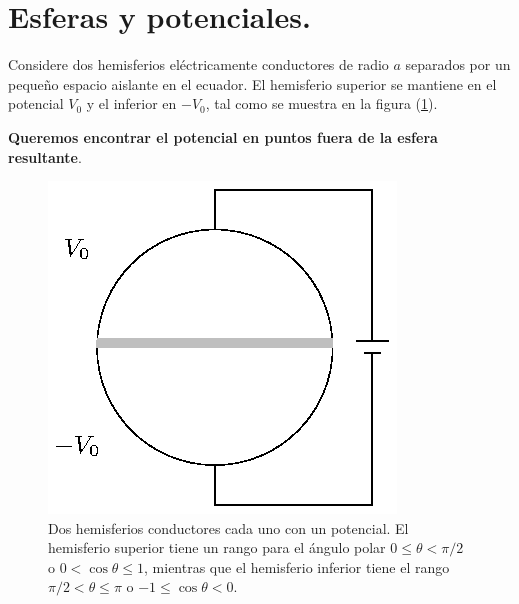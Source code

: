 \section{Esferas y potenciales.}

Considere dos hemisferios eléctricamente conductores de radio $a$ separados por un pequeño espacio aislante en el ecuador. El hemisferio superior se mantiene en el potencial $V_{0}$ y el inferior en $-V_{0}$, tal como se muestra en la figura (\ref{fig_figura_esfera_03}).
\par
\textbf{Queremos encontrar el potencial en puntos fuera de la esfera resultante}.
\begin{figure}[H]
    \centering
    \includegraphics[scale=1.3]{Imagenes/Ejemplo_Esfera_03.eps}
    \caption{Dos hemisferios conductores cada uno con un potencial. El hemisferio superior tiene un rango para el ángulo polar $0 \leq \theta < \pi/2$ o $0 < \cos \theta \leq 1$, mientras que el hemisferio inferior tiene el rango $\pi/2 < \theta \leq \pi $ o $-1 \leq \cos \theta < 0$.}
    \label{fig_figura_esfera_03}
\end{figure}

